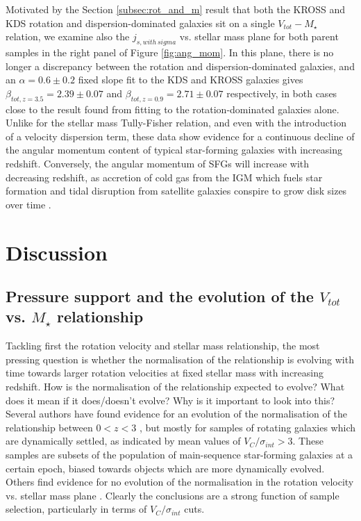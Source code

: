 \documentclass[fleqn,usenatbib]{mnras}
\begin{document}
Motivated by the Section \ref{subsec:rot_and_m} result that both the KROSS and KDS rotation and dispersion-dominated galaxies sit on a single $V_{tot}-M_{\star}$ relation, we examine also the $j_{s,with\,sigma}$ vs. stellar mass plane for both parent samples in the right panel of Figure \ref{fig:ang_mom}.
In this plane, there is no longer a discrepancy between the rotation and dispersion-dominated galaxies, and an $\alpha=0.6\pm0.2$ fixed slope fit to the KDS and KROSS galaxies gives $\beta_{tot,z=3.5} = 2.39\pm0.07$ and $\beta_{tot,z=0.9} = 2.71\pm0.07$ respectively, in both cases close to the result found from fitting to the rotation-dominated galaxies alone.
Unlike for the stellar mass Tully-Fisher relation, and even with the introduction of a velocity dispersion term, these data show evidence for a  continuous decline of the angular momentum content of typical star-forming galaxies with increasing redshift.
Conversely, the angular momentum of SFGs will increase with decreasing redshift, as accretion of cold gas from the IGM which fuels star formation and tidal disruption from satellite galaxies conspire to grow disk sizes over time \citep{Trujillo2007,Buitrago2008,VanderWel2014a}.

\section{Discussion}\label{sec:discussion}
\subsection{Pressure support and the evolution of the $V_{tot}$ vs. $M_{\star}$ relationship}\label{subsec:tf_discussion}
Tackling first the rotation velocity and stellar mass relationship, the most pressing question is whether the normalisation of the relationship is evolving with time towards larger rotation velocities at fixed stellar mass with increasing redshift.
How is the normalisation of the relationship expected to evolve? What does it mean if it does/doesn't evolve? Why is it important to look into this?
Several authors have found evidence for an evolution of the normalisation of the relationship between $0 < z < 3$ \citep[e.g.][]{Puech2008,Cresci2009,Gnerucci2011,Simons2016,Tiley2016,Straatman2017,Ubler2017}, but mostly for samples of rotating galaxies which are dynamically settled, as indicated by mean values of $V_{C}/\sigma_{int} > 3$.
These samples are subsets of the population of main-sequence star-forming galaxies at a certain epoch, biased towards objects which are more dynamically evolved. 
Others find evidence for no evolution of the normalisation in the rotation velocity vs. stellar mass plane \citep[e.g.][]{Flores2006,Miller2011,Kassin2012,Miller2012,Vergani2012,Miller2014,Contini2015a,DiTeodoro2016,Pelliccia2017,Molina2017,Harrison2017}. 
Clearly the conclusions are a strong function of sample selection, particularly in terms of $V_{C}/\sigma_{int}$ cuts. \\
\end{document}
